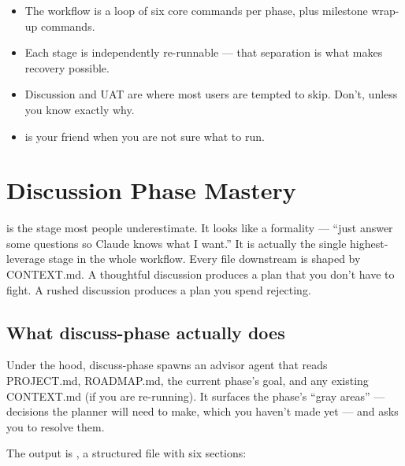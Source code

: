 \documentclass[11pt,letterpaper,openany]{book}
\begin{document}
\begin{gsdnote}[title=Key Takeaways]
\begin{itemize}[itemsep=2pt,leftmargin=1.2em]
  \item The workflow is a loop of six core commands per phase, plus milestone wrap-up commands.
  \item Each stage is independently re-runnable --- that separation is what makes recovery possible.
  \item Discussion and UAT are where most users are tempted to skip. Don't, unless you know exactly why.
  \item {} is your friend when you are not sure what to run.
\end{itemize}
\end{gsdnote}

\chapter{Discussion Phase Mastery}

 is the stage most people underestimate. It looks like a formality --- ``just answer some questions so Claude knows what I want.'' It is actually the single highest-leverage stage in the whole workflow. Every file downstream is shaped by CONTEXT.md. A thoughtful discussion produces a plan that you don't have to fight. A rushed discussion produces a plan you spend  rejecting.

\section{What discuss-phase actually does}

Under the hood, discuss-phase spawns an advisor agent that reads PROJECT.md, ROADMAP.md, the current phase's goal, and any existing CONTEXT.md (if you are re-running). It surfaces the phase's ``gray areas'' --- decisions the planner will need to make, which you haven't made yet --- and asks you to resolve them.

The output is , a structured file with six sections:
\end{document}
